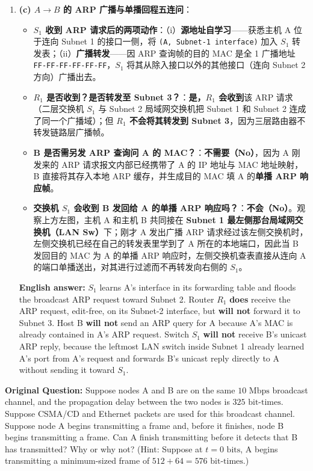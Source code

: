 \begin{enumerate}
\item \textbf{(c) $A \to B$ 的 ARP 广播与单播回程五连问}：
  \begin{itemize}
  \item \textbf{$S_1$ 收到 ARP 请求后的两项动作}：（i）\textbf{源地址自学习}——获悉主机 A 位于连向 Subnet 1 的接口一侧，将 \texttt{(A, Subnet-1 interface)} 加入 $S_1$ 转发表；（ii）\textbf{广播转发}——因 ARP 查询帧的目的 MAC 是全 1 广播地址 \texttt{FF-FF-FF-FF-FF-FF}，$S_1$ 将其从除入接口以外的其他接口（连向 Subnet 2 方向）广播出去。
  \item \textbf{$R_1$ 是否收到？是否转发至 Subnet 3？}：\textbf{是，$R_1$ 会收到}该 ARP 请求（二层交换机 $S_1$ 与 Subnet 2 局域网交换机把 Subnet 1 和 Subnet 2 连成了同一个广播域）；但 \textbf{$R_1$ 不会将其转发到 Subnet 3}，因为三层路由器不转发链路层广播帧。
  \item \textbf{B 是否需另发 ARP 查询问 A 的 MAC？}：\textbf{不需要（No）}，因为 A 刚发来的 ARP 请求报文内部已经携带了 A 的 IP 地址与 MAC 地址映射，B 直接将其存入本地 ARP 缓存，并生成目的 MAC 填 A 的\textbf{单播 ARP 响应帧}。
  \item \textbf{交换机 $S_1$ 会收到 B 发回给 A 的单播 ARP 响应吗？}：\textbf{不会（No）}。观察上方左图，主机 A 和主机 B 共同接在 \textbf{Subnet 1 最左侧那台局域网交换机（LAN Sw）}下；刚才 A 发出广播 ARP 请求经过该左侧交换机时，左侧交换机已经在自己的转发表里学到了 A 所在的本地端口，因此当 B 发回目的 MAC 为 A 的单播 ARP 响应时，左侧交换机查表直接从连向 A 的端口单播送出，对其进行过滤而不再转发向右侧的 $S_1$。
  \end{itemize}
  \textbf{English answer:} $S_1$ learns A's interface in its forwarding table and floods the broadcast ARP request toward Subnet 2. Router $R_1$ \textbf{does} receive the ARP request, edit-free, on its Subnet-2 interface, but \textbf{will not} forward it to Subnet 3. Host B \textbf{will not} send an ARP query for A because A's MAC is already contained in A's ARP request. Switch $S_1$ \textbf{will not} receive B's unicast ARP reply, because the leftmost LAN switch inside Subnet 1 already learned A's port from A's request and forwards B's unicast reply directly to A without sending it toward $S_1$.
\end{enumerate}



\textbf{Original Question:} Suppose nodes A and B are on the same $10\text{ Mbps}$ broadcast channel, and the propagation delay between the two nodes is $325\text{ bit-times}$. Suppose CSMA/CD and Ethernet packets are used for this broadcast channel. Suppose node A begins transmitting a frame and, before it finishes, node B begins transmitting a frame. Can A finish transmitting before it detects that B has transmitted? Why or why not? (Hint: Suppose at $t=0\text{ bits}$, A begins transmitting a minimum-sized frame of $512 + 64 = 576\text{ bit-times}$.)

